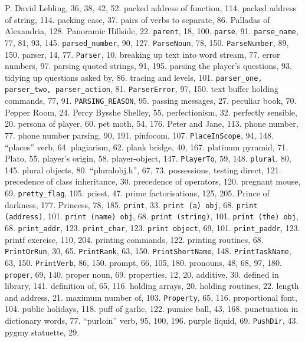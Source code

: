 {{{P. David Lebling, 36, 38, 42, 52.
packed address of function, 114.
packed address of string, 114.
packing case, 37.
pairs of verbs to separate, 86.
Palladas of Alexandria, 128.
Panoramic Hillside, 22.
{{\tt parent}}, 18, 100.
{{\tt parse}}, 91.
{{\tt parse\_name}}, 77, 81, 93, 145.
{{\tt parsed\_number}}, 90, 127.
{{\tt ParseNoun}}, 78, 150.
{{\tt ParseNumber}}, 89, 150.
parser, 14, 77.
{{\tt Parser}}, 10.
\quad  breaking up text into word stream, 77.
\quad  error numbers, 97.
\quad  parsing quoted strings, 91, 195.
\quad  parsing the player's questions, 93.
\quad  tidying up questions asked by, 86.
\quad  tracing and levels, 101.
{{\tt parser\_one, parser\_two, parser\_action}}, 81.
{{\tt ParserError}}, 97, 150.
\quad  text buffer holding commands, 77, 91.
{{\tt PARSING\_REASON}}, 95.
passing messages, 27.
peculiar book, 70.
Pepper Room, 24.
Percy Bysshe Shelley, 55.
perfectionism, 32.
perfectly sensible, 20.
persona of player, 60.
pet moth, 54, 176.
Peter and Jane, 113.
phone number, 77.
phone number parsing, 90, 191.
pinfocom, 107.
{{\tt PlaceInScope}}, 94, 148.
``places'' verb, 64.
plagiarism, 62.
plank bridge, 40, 167.
platinum pyramid, 71.
Plato, 55.
player's origin, 58.
player-object, 147.
{{\tt PlayerTo}}, 59, 148.
{{\tt plural}}, 80, 145.
plural objects, 80.
``pluralobj.h'', 67, 73.
possessions, testing direct, 121.
precedence of class inheritance, 30.
precedence of operators, 120.
pregnant mouse, 69.
{{\tt pretty\_flag}}, 105.
priest, 47.
prime factorisations, 125, 205.
Prince of darkness, 177.
Princess, 78, 185.
{{\tt print}}, 33.
{{\tt print (a) obj}}, 68.
{{\tt print (address)}}, 101.
{{\tt print (name) obj}}, 68.
{{\tt print (string)}}, 101.
{{\tt print (the) obj}}, 68.
{{\tt print\_addr}}, 123.
{{\tt print\_char}}, 123.
{{\tt print object}}, 69, 101.
{{\tt print\_paddr}}, 123.
printf exercise, 110, 204.
printing commands, 122.
printing routines, 68.
{{\tt PrintOrRun}}, 30, 65.
{{\tt PrintRank}}, 63, 150.
{{\tt PrintShortName}}, 148.
{{\tt PrintTaskName}}, 63, 150.
{{\tt PrintVerb}}, 86, 150.
prompt, 66, 105, 180.
pronouns, 48, 68, 97, 180.
{{\tt proper}}, 69, 140.
proper noun, 69.
properties, 12, 20.
\quad  additive, 30.
\quad  defined in library, 141.
\quad  definition of, 65, 116.
\quad  holding arrays, 20.
\quad  holding routines, 22.
\quad  length and address, 21.
\quad  maximum number of, 103.
{{\tt Property}}, 65, 116.
proportional font, 104.
public holidays, 118.
puff of garlic, 122.
pumice ball, 43, 168.
punctuation in dictionary words, 77.
``purloin'' verb, 95, 100, 196.
purple liquid, 69.
{{\tt PushDir}}, 43.
pygmy statuette, 29.

}}}
